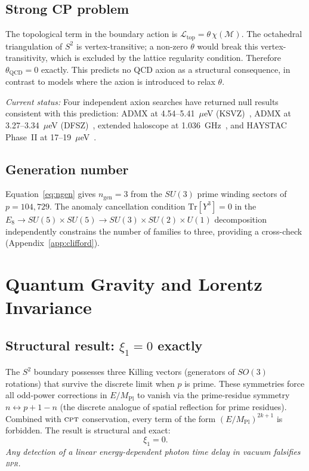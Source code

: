 \documentclass[aps,prd,twocolumn,superscriptaddress,longbibliography,nofootinbib]{revtex4-2}
\newcommand{\Stwo}{S^2}
\newcommand{\MPl}{M_{\mathrm{Pl}}}
\newcommand{\bpr}{\textsc{bpr}}
\newcommand{\CPT}{\textsc{cpt}}
\begin{document}
\subsection{Strong CP problem}

The topological term in the boundary action is
$\mathcal{L}_{\mathrm{top}} = \theta\,\chi(\mathcal{M})$.
The octahedral triangulation of $\Stwo$ is vertex-transitive; a non-zero
$\theta$ would break this vertex-transitivity, which is excluded by the
lattice regularity condition.  Therefore $\theta_{\mathrm{QCD}} = 0$ exactly.
This predicts no QCD axion as a structural consequence, in contrast to
models where the axion is introduced to relax $\theta$.

\textit{Current status:} Four independent axion searches have returned null
results consistent with this prediction: ADMX at 4.54--5.41~$\mu$eV
(KSVZ)~\cite{ADMX2025a}, ADMX at 3.27--3.34~$\mu$eV
(DFSZ)~\cite{ADMX2024}, extended haloscope at 1.036~GHz~\cite{Haloscope2026},
and HAYSTAC Phase~II at 17--19~$\mu$eV~\cite{HAYSTAC2024}.

\subsection{Generation number}

Equation~\eqref{eq:ngen} gives $n_{\mathrm{gen}} = 3$ from the $SU(3)$ prime
winding sectors of $p = 104{,}729$.  The anomaly cancellation condition
$\text{Tr}[Y^3] = 0$ in the $E_8 \to SU(5)\times SU(5) \to SU(3)\times SU(2)\times U(1)$
decomposition independently constrains the number of families to three,
providing a cross-check (Appendix~\ref{app:clifford}).


\section{Quantum Gravity and Lorentz Invariance}
\label{sec:qg}

\subsection{Structural result: $\xi_1 = 0$ exactly}

The $\Stwo$ boundary possesses three Killing vectors (generators of $SO(3)$
rotations) that survive the discrete limit when $p$ is prime.  These
symmetries force all odd-power corrections in $E/\MPl$ to vanish via
the prime-residue symmetry $n \leftrightarrow p + 1 - n$
(the discrete analogue of spatial reflection for prime residues).
Combined with $\CPT$ conservation, every term of the form $(E/\MPl)^{2k+1}$
is forbidden.  The result is structural and exact:
\begin{equation}
\boxed{\xi_1 = 0.}
\label{eq:xi1}
\end{equation}
\textit{Any detection of a linear energy-dependent photon time delay in
vacuum falsifies \bpr.}
\end{document}
